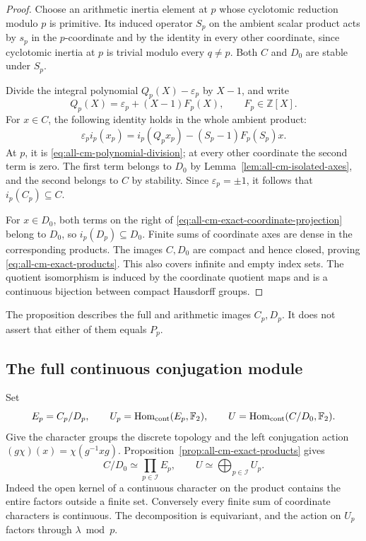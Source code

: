 \begin{proof}
Choose an arithmetic inertia element at \(p\) whose
cyclotomic reduction modulo \(p\) is primitive.
Its induced operator \(S_p\) on the ambient scalar product
acts by \(s_p\) in the \(p\)-coordinate and by the identity
in every other coordinate, since cyclotomic inertia at \(p\)
is trivial modulo every \(q\ne p\).
Both \(C\) and \(D_0\) are stable under \(S_p\).

Divide the integral polynomial \(Q_p(X)-\varepsilon_p\)
by \(X-1\), and write
\begin{equation}
                     Q_p(X)=\varepsilon_p+(X-1)F_p(X),
                     \qquad F_p\in\mathbb Z[X].
 \label{eq:all-cm-polynomial-division}
\end{equation}
For \(x\in C\), the following identity holds in the whole
ambient product:
\begin{equation}
 \varepsilon_p i_p(x_p)
       =i_p(Q_px_p)-(S_p-1)F_p(S_p)x.
 \label{eq:all-cm-exact-coordinate-projection}
\end{equation}
At \(p\), it is \eqref{eq:all-cm-polynomial-division};
at every other coordinate the second term is zero.
The first term belongs to \(D_0\) by
Lemma~\ref{lem:all-cm-isolated-axes}, and the second
belongs to \(C\) by stability.
Since \(\varepsilon_p=\pm1\), it follows that
\(i_p(C_p)\subseteq C\).

For \(x\in D_0\), both terms on the right of
\eqref{eq:all-cm-exact-coordinate-projection}
belong to \(D_0\), so \(i_p(D_p)\subseteq D_0\).
Finite sums of coordinate axes are dense in the
corresponding products. The images \(C,D_0\) are
compact and hence closed, proving
\eqref{eq:all-cm-exact-products}.
This also covers infinite and empty index sets.
The quotient isomorphism is induced by the coordinate
quotient maps and is a continuous bijection between
compact Hausdorff groups.
\end{proof}

The proposition describes the full and arithmetic images \(C_p,D_p\).
It does not assert that either of them equals \(P_p\).

\subsection{The full continuous conjugation module}

Set
\[
 E_p=C_p/D_p,\qquad
 U_p=\operatorname{Hom}_{\rm cont}(E_p,\mathbb F_2),\qquad
 U=\operatorname{Hom}_{\rm cont}(C/D_0,\mathbb F_2).
\]
Give the character groups the discrete topology and the
left conjugation action
\((g\chi)(x)=\chi(g^{-1}xg)\).
Proposition~\ref{prop:all-cm-exact-products} gives
\begin{equation}
 C/D_0\simeq\prod_{p\in\mathcal I}E_p,\qquad
 U\simeq\bigoplus_{p\in\mathcal I}U_p.
 \label{eq:all-cm-character-decomposition}
\end{equation}
Indeed the open kernel of a continuous character on the
product contains the entire factors outside a finite set.
Conversely every finite sum of coordinate characters is
continuous. The decomposition is equivariant, and the
action on \(U_p\) factors through \(\lambda\bmod p\).

